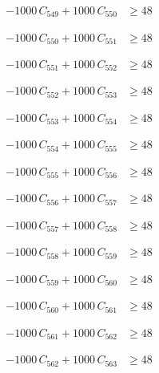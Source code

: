 \documentclass[a4paper,11pt]{article}
\begin{document}
\begin{align}
-1000\,C_{549} + 1000\,C_{550} &\geq 48 \nonumber
\end{align}

\begin{align}
-1000\,C_{550} + 1000\,C_{551} &\geq 48 \nonumber
\end{align}

\begin{align}
-1000\,C_{551} + 1000\,C_{552} &\geq 48 \nonumber
\end{align}

\begin{align}
-1000\,C_{552} + 1000\,C_{553} &\geq 48 \nonumber
\end{align}

\begin{align}
-1000\,C_{553} + 1000\,C_{554} &\geq 48 \nonumber
\end{align}

\begin{align}
-1000\,C_{554} + 1000\,C_{555} &\geq 48 \nonumber
\end{align}

\begin{align}
-1000\,C_{555} + 1000\,C_{556} &\geq 48 \nonumber
\end{align}

\begin{align}
-1000\,C_{556} + 1000\,C_{557} &\geq 48 \nonumber
\end{align}

\begin{align}
-1000\,C_{557} + 1000\,C_{558} &\geq 48 \nonumber
\end{align}

\begin{align}
-1000\,C_{558} + 1000\,C_{559} &\geq 48 \nonumber
\end{align}

\begin{align}
-1000\,C_{559} + 1000\,C_{560} &\geq 48 \nonumber
\end{align}

\begin{align}
-1000\,C_{560} + 1000\,C_{561} &\geq 48 \nonumber
\end{align}

\begin{align}
-1000\,C_{561} + 1000\,C_{562} &\geq 48 \nonumber
\end{align}

\begin{align}
-1000\,C_{562} + 1000\,C_{563} &\geq 48 \nonumber
\end{align}
\end{document}
